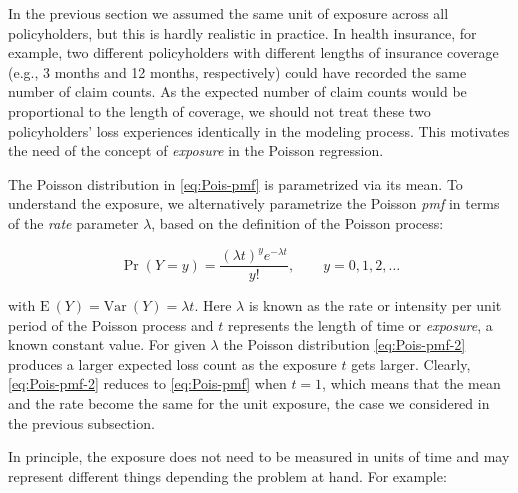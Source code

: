 \documentclass[]{book}
\theoremstyle{definition}
\theoremstyle{definition}
\theoremstyle{definition}
\theoremstyle{remark}
\begin{document}
In the previous section we assumed the same unit of exposure across all
policyholders, but this is hardly realistic in practice. In health
insurance, for example, two different policyholders with different
lengths of insurance coverage (e.g., 3 months and 12 months,
respectively) could have recorded the same number of claim counts. As
the expected number of claim counts would be proportional to the length
of coverage, we should not treat these two policyholders' loss
experiences identically in the modeling process. This motivates the need
of the concept of \emph{exposure} in the Poisson regression.

The Poisson distribution in \eqref{eq:Pois-pmf} is parametrized via its
mean. To understand the exposure, we alternatively parametrize the
Poisson \emph{pmf} in terms of the \emph{rate} parameter \(\lambda\),
based on the definition of the Poisson process:

\begin{equation}
\Pr(Y=y)=\frac{(\lambda t)^y e^{-\lambda t}}{y!},\qquad y=0,1,2, \ldots
\label{eq:Pois-pmf-2}
\end{equation}

with \(\mathrm{E~}{(Y)}=\mathrm{Var~}{(Y)}=\lambda t\). Here \(\lambda\)
is known as the rate or intensity per unit period of the Poisson process
and \(t\) represents the length of time or \emph{exposure}, a known
constant value. For given \(\lambda\) the Poisson distribution
\eqref{eq:Pois-pmf-2} produces a larger expected loss count as the
exposure \(t\) gets larger. Clearly, \eqref{eq:Pois-pmf-2} reduces to
\eqref{eq:Pois-pmf} when \(t=1\), which means that the mean and the rate
become the same for the unit exposure, the case we considered in the
previous subsection.

In principle, the exposure does not need to be measured in units of time
and may represent different things depending the problem at hand. For
example:
\end{document}
